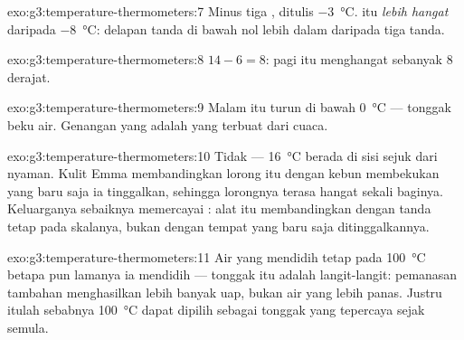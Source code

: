 \begin{solution}{exo:g3:temperature-thermometers:7}
Minus tiga , ditulis \qty{-3}{\celsius}.  itu
\emph{lebih hangat} daripada \qty{-8}{\celsius}: delapan tanda di
bawah nol lebih dalam  daripada tiga tanda.
\end{solution}

\begin{solution}{exo:g3:temperature-thermometers:8}
$14 - 6 = 8$: pagi itu menghangat sebanyak $8$ derajat.
\end{solution}

\begin{solution}{exo:g3:temperature-thermometers:9}
Malam itu turun di bawah \qty{0}{\celsius} --- tonggak beku air.
Genangan yang  adalah  yang terbuat dari cuaca.
\end{solution}

\begin{solution}{exo:g3:temperature-thermometers:10}
Tidak --- \qty{16}{\celsius} berada di sisi sejuk dari nyaman. Kulit
Emma membandingkan lorong itu dengan kebun membekukan yang baru saja
ia tinggalkan, sehingga lorongnya terasa hangat sekali baginya.
Keluarganya sebaiknya memercayai : alat itu membandingkan
dengan tanda tetap pada skalanya, bukan dengan tempat yang baru saja
ditinggalkannya.
\end{solution}

\begin{solution}{exo:g3:temperature-thermometers:11}
Air yang mendidih tetap pada \qty{100}{\celsius} betapa pun lamanya ia
mendidih --- tonggak itu adalah langit-langit: pemanasan tambahan
menghasilkan lebih banyak uap, bukan air yang lebih panas. Justru
itulah sebabnya \qty{100}{\celsius} dapat dipilih sebagai tonggak yang
tepercaya sejak semula.
\end{solution}
